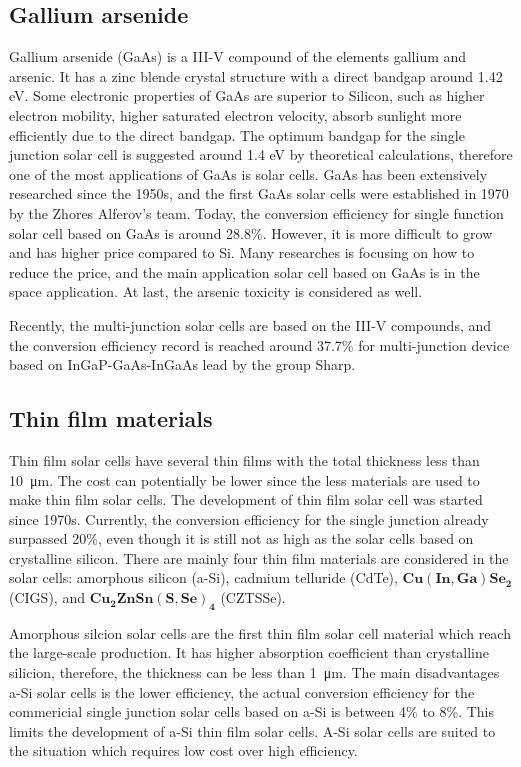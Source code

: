 \documentclass[a4paper, 12pt, titlepage,oneside,drop]{kthesis}
\begin{document}
\subsection{Gallium arsenide}
Gallium arsenide (GaAs) is a III-V compound of the elements gallium and arsenic. It has a zinc blende crystal structure with a direct bandgap around 1.42 eV. Some electronic properties of GaAs are superior to Silicon, such as higher electron 
mobility, higher saturated electron velocity, absorb sunlight more efficiently due to the direct bandgap. The optimum bandgap for the single junction solar cell is suggested around 1.4 eV by theoretical calculations,
therefore one of the most applications of GaAs is solar cells. GaAs has been extensively researched since the 1950s, and the first GaAs solar cells were established in 1970 by the Zhores Alferov's team. Today,
the conversion efficiency for single function solar cell based on GaAs is around 28.8\%. However, it is more difficult to grow and has higher price compared to Si. Many researches is focusing on how to reduce the price, and 
the main application solar cell based on GaAs is in the space application. At last, the arsenic toxicity is considered as well. 

Recently, the multi-junction solar cells are based on the III-V compounds, and the conversion efficiency record is reached around 37.7\% for multi-junction
device based on InGaP-GaAs-InGaAs lead by the group Sharp.

\subsection{Thin film materials}

Thin film solar cells have several thin films with the total thickness less than \SI{10} {\micro\meter}. The cost can potentially be lower since the less materials are used to make thin film solar cells. The development of thin film
solar cell was started since 1970s. Currently, the conversion efficiency for the single junction already surpassed 20\%, even though it is still not as high as the solar cells based on crystalline silicon. There are mainly four 
thin film materials are considered in the solar cells: amorphous silicon (a-Si), cadmium telluride (CdTe), $\mathbf {Cu(In, Ga)Se_2}$ (CIGS),  and $\mathbf {Cu_{2}ZnSn(S,Se)_{4}}$ (CZTSSe).

Amorphous silcion solar cells are the first thin film solar cell material which reach the large-scale production. It has higher absorption coefficient than crystalline silicion, therefore, the thickness can be less than \SI{1} {\micro\meter}. The 
main disadvantages a-Si solar cells is the lower efficiency, the actual conversion efficiency for the commericial single junction solar cells based on a-Si is between 4\% to 8\%. This limits the development of a-Si thin film solar cells.
A-Si solar cells are suited to the situation which requires low cost over high efficiency. 
\end{document}
